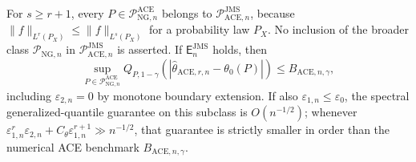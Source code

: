 For \(s\ge r+1\), every \(P\in\mathcal P_{\mathrm{NG},n}^{\mathrm{ACE}}\) belongs to \(\mathcal P_{\mathrm{ACE},n}^{\mathrm{JMS}}\), because \(\|f\|_{L^r(P_X)}\le\|f\|_{L^s(P_X)}\) for a probability law \(P_X\). No inclusion of the broader class \(\mathcal P_{\mathrm{NG},n}\) in \(\mathcal P_{\mathrm{ACE},n}^{\mathrm{JMS}}\) is asserted. If \(\mathsf E_n^{\mathrm{JMS}}\) holds, then
\[
 \sup_{P\in\mathcal P_{\mathrm{NG},n}^{\mathrm{ACE}}}
 Q_{P,1-\gamma}(|\widehat\theta_{\mathrm{ACE},r,n}-\theta_0(P)|)
 \le B_{\mathrm{ACE},n,\gamma},
\]
including \(\varepsilon_{2,n}=0\) by monotone boundary extension. If also \(\varepsilon_{1,n}\le\varepsilon_0\), the spectral generalized-quantile guarantee on this subclass is \(O(n^{-1/2})\); whenever \(\varepsilon_{1,n}^r\varepsilon_{2,n}+C_{\theta}\varepsilon_{1,n}^{r+1}\gg n^{-1/2}\), that guarantee is strictly smaller in order than the numerical ACE benchmark \(B_{\mathrm{ACE},n,\gamma}\).